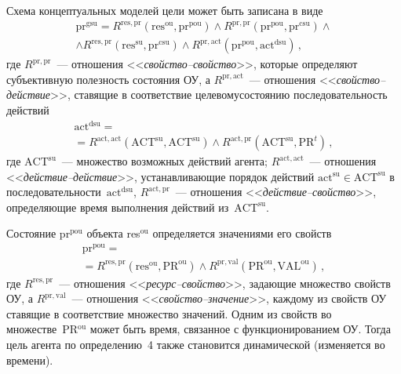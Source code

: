 \begin{multicols}{2}
  \smallskip
  Схема концептуальных моделей цели может быть записана в виде
  \begin{multline*}
\mathrm{pr}^{\mathrm{gsu}} = R^{\mathrm{res},\mathrm{pr}}(\mathrm{res}^{\mathrm{ou}},\mathrm{pr}^{\mathrm{pou}}) \wedge 
R^{\mathrm{pr},\mathrm{pr}}(\mathrm{pr}^{\mathrm{pou}},\mathrm{pr}^{\mathrm{csu}})\wedge\\
\wedge R^{\mathrm{res},\mathrm{pr}}(\mathrm{res}^{\mathrm{su}},\mathrm{pr}^{\mathrm{csu}})\wedge 
R^{\mathrm{pr},\mathrm{act}}(\mathrm{pr}^{\mathrm{pou}}, \mathrm{act}^{\mathrm{dsu}})\,,
\end{multline*}
где $R^{\mathrm{pr},\mathrm{pr}}$~--- отношения <<\textit{свойство--свойство}>>, которые определяют 
субъективную полезность состояния ОУ, а $R^{\mathrm{pr},\mathrm{act}}$~--- отношения 
<<\textit{свойство--действие}>>, ставящие в соответствие целевому\linebreak состоянию 
последовательность действий
  \begin{multline*}
  \mathrm{act}^{\mathrm{dsu}} ={}\\
  {}= R^{\mathrm{act,act}}(\mathrm{ACT}^{\mathrm{su}},\mathrm{ACT}^{\mathrm{su}})\wedge 
R^{\mathrm{act,pr}}(\mathrm{ACT}^{\mathrm{su}},\mathrm{PR}^t)\,,
  \end{multline*}
    где $\mathrm{ACT}^{\mathrm{su}}$~--- множество возможных действий агента; $R^{\mathrm{act,act}}$~--- 
отношения <<\textit{действие--действие}>>, устанавливающие порядок действий 
$\mathrm{act}^{\mathrm{su}}\in \mathrm{ACT}^{\mathrm{su}}$ в 
последовательности~$\mathrm{act}^{\mathrm{dsu}}$, $R^{\mathrm{act,pr}}$~--- отношения 
<<\textit{действие--свойство}>>, определяющие время выполнения действий 
из~$\mathrm{ACT}^{\mathrm{su}}$.
  
  Состояние pr$^{\mathrm{pou}}$  объекта res$^{\mathrm{ou}}$ определяется значениями его 
свойств
  \begin{multline*}
\mathrm{pr}^{\mathrm{pou}} ={}\\
  {}=
   R^{\mathrm{res,pr}} (\mathrm{res}^{\mathrm{ou}},\mathrm{PR}^{\mathrm{ou}})\wedge 
R^{\mathrm{pr,val}}(\mathrm{PR}^{\mathrm{ou}},\mathrm{VAL}^{\mathrm{ou}})\,,
  \end{multline*}
где $R^{\mathrm{res,pr}}$~--- отношения <<\textit{ресурс--свойство}>>, за\-да\-ющие 
множество свойств ОУ, а $R^{\mathrm{pr,val}}$~--- отношения 
<<\textit{свойство--значение}>>, каждому из свойств ОУ ставящие в 
соответствие множество значений. Одним из свойств во множестве~PR$^{\mathrm{ou}}$ 
может быть время, связанное с функционированием ОУ. Тогда цель агента по 
определению~4 также становится динамической (изменяется во времени).
  

\end{multicols}
